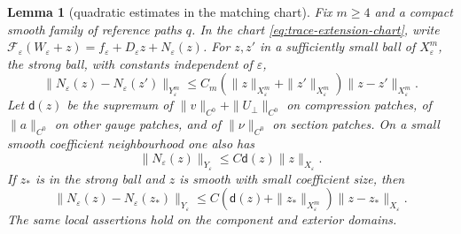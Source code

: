 \documentclass[11pt]{amsart}
\newtheorem{lemma}[theorem]{Lemma}
\theoremstyle{definition}
\theoremstyle{remark}
\theoremstyle{plain}
\numberwithin{equation}{section}
\newcommand{\eps}{\varepsilon}
\begin{document}
\begin{lemma}[quadratic estimates in the matching chart]\label{lem:block}
Fix $m\ge4$ and a compact smooth family of reference paths $q$.
In the chart \eqref{eq:trace-extension-chart}, write
$\mathcal F_\eps(W_\eps+z)=f_\eps+D_\eps z+N_\eps(z)$.
For $z,z'$ in a sufficiently small ball of $X^m_\eps$, the \emph{strong ball}, with
constants independent of $\eps$,
\begin{equation}\label{eq:strong-quadratic}
\|N_\eps(z)-N_\eps(z')\|_{Y^m_\eps}
 \le C_m(\|z\|_{X^m_\eps}+\|z'\|_{X^m_\eps})
             \|z-z'\|_{X^m_\eps}.
\end{equation}
Let $\mathsf d(z)$ be the supremum of $\|v\|_{C^0}+
\|U_\perp\|_{C^0}$ on compression patches, of $\|a\|_{C^0}$ on
other gauge patches, and of $\|\nu\|_{C^0}$ on section patches.
On a small smooth coefficient neighbourhood one also has
\begin{equation}\label{eq:low-quadratic}
\|N_\eps(z)\|_{Y_\eps}\le C\mathsf d(z)\|z\|_{X_\eps}.
\end{equation}
If $z_*$ is in the strong ball and $z$ is smooth with small
coefficient size, then
\begin{equation}\label{eq:asymmetric-quadratic}
\|N_\eps(z)-N_\eps(z_*)\|_{Y_\eps}
 \le C(\mathsf d(z)+\|z_*\|_{X^m_\eps})\|z-z_*\|_{X_\eps}.
\end{equation}
The same local assertions hold on the component and exterior domains.
\end{lemma}
\end{document}
